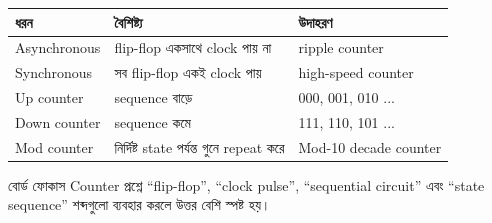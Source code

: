 \begin{center}
\begin{tabular}{|p{}|p{}|p{}|}
\hline
\textbf{ধরন} & \textbf{বৈশিষ্ট্য} & \textbf{উদাহরণ} \\
\hline
Asynchronous & flip-flop একসাথে clock পায় না & ripple counter \\
\hline
Synchronous & সব flip-flop একই clock পায় & high-speed counter \\
\hline
Up counter & sequence বাড়ে & 000, 001, 010 ... \\
\hline
Down counter & sequence কমে & 111, 110, 101 ... \\
\hline
Mod counter & নির্দিষ্ট state পর্যন্ত গুনে repeat করে & Mod-10 decade counter \\
\hline
\end{tabular}
\end{center}

\begin{center}
\end{center}

\begin{boardbox}{বোর্ড ফোকাস}
Counter প্রশ্নে ``flip-flop'', ``clock pulse'', ``sequential circuit'' এবং ``state sequence'' শব্দগুলো ব্যবহার করলে উত্তর বেশি স্পষ্ট হয়।
\end{boardbox}
